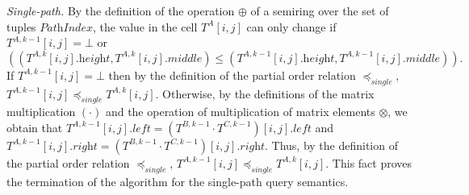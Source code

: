 \textit{Single-path.} %
By the definition of the operation $\oplus$ of a semiring over the set of tuples $\textit{PathIndex}$, the value in the cell $T^A[i, j]$ can only change if $T^{A, k - 1}[i, j] = \bot$ or $$((T^{A, k}[i, j].\textit{height}, T^{A, k}[i, j].\textit{middle}) \leq (T^{A, k - 1}[i, j].\textit{height}, T^{A, k - 1}[i, j].\textit{middle})).$$ If $T ^{A, k - 1}[i, j] = \bot$ then by the definition of the partial order relation $\preceq_{\textit{single}}$, $T^{A, k - 1}[i, j] \preceq_{\textit{single}} T^{A, k}[i, j]$. Otherwise, by the definitions of the matrix multiplication $(\cdot)$ and the operation of multiplication of matrix elements $\otimes$, we obtain that $T^{A, k - 1}[i, j].\textit{left} = (T^ {B, k - 1} \cdot T^{C, k - 1})[i, j].\textit{left}$ and $T^{A, k - 1}[i, j].\textit {right} = (T^{B, k - 1} \cdot T^{C, k - 1})[i, j].\textit{right}$. Thus, by the definition of the partial order relation $\preceq_{\textit{single}}$, $T^{A, k - 1}[i, j] \preceq_{\textit{single}} T^{A, k}[i, j]$. This fact proves the termination of the algorithm for the single-path query semantics.

